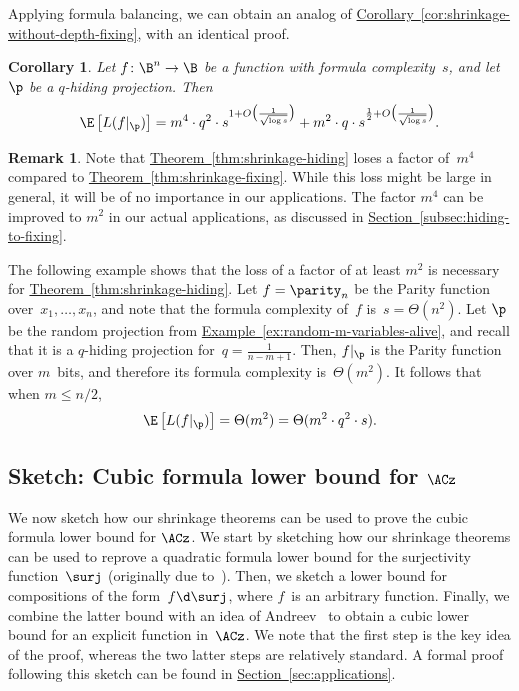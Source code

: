 \documentclass[11pt]{article}
\numberwithin{equation}{section}
\newtheorem{corollary}[theorem]{Corollary}
\theoremstyle{definition}
\newtheorem{remark}[theorem]{Remark}
\theoremstyle{plain}
\newcommand{\expref}[2]{\hyperref[#2]{#1~\ref{#2}}}
\theoremstyle{definition}\newtheorem{notation}[theorem]{Notation}\theoremstyle{plain}
\begin{document}
Applying formula balancing, we can obtain an analog of 
\expref{Corollary}{cor:shrinkage-without-depth-fixing},
with an identical proof. 
\begin{corollary}
\label{cor:shrinkage-without-depth-hiding} Let $f\colon\B^{n}\to\B$
be a function with formula complexity~$s$, and let $\p$ be a $q$-hiding
projection. Then 
\[
\E\left[L(f|_{\p})\right]=m^{4}\cdot q^{2}\cdot s^{1+O\bigl(\frac{1}{\sqrt{\log s}}\bigr)}+m^{2}\cdot q\cdot s^{\frac{1}{2}+O\bigl(\frac{1}{\sqrt{\log s}}\bigr)}.
\]
\end{corollary}

\begin{remark}
Note that \expref{Theorem}{thm:shrinkage-hiding} 
loses a factor of~$m^{4}$ compared
to \expref{Theorem}{thm:shrinkage-fixing}. While 
this loss might be large in general,
it will be of no importance in our applications. The factor $m^{4}$
can be improved to $m^{2}$ in our actual applications, as discussed
in %
\expref{Section}{subsec:hiding-to-fixing}.  %

The following example shows that the loss of a factor of at least
$m^{2}$ is necessary for \expref{Theorem}{thm:shrinkage-hiding}. 
Let $f=\parity_{n}$
be the Parity function over~$x_{1},\ldots,x_{n}$, and note that
the formula complexity of~$f$ is~$s=\Theta(n^{2})$. Let $\p$
be the random projection from \expref{Example}{ex:random-m-variables-alive}, and
recall that it is a $q$-hiding projection for~$q=\frac{1}{n-m+1}$.
Then, $f|_{\p}$ is the Parity function over $m$~bits, and therefore
its formula complexity is~$\Theta(m^{2})$. It follows that when
$m\leq n/2$, 
\[
\E\left[L(f|_{\p})\right]=\Theta(m^{2})=\Theta(m^{2}\cdot q^{2}\cdot s).
\]
\end{remark}


\subsection{\label{subsec:application-sketch}Sketch: Cubic formula lower bound
for \texorpdfstring{$\protect\ACz$}{AC0}}

We now sketch how our shrinkage theorems can be used to prove the
cubic formula lower bound for $\ACz$. We start by sketching how our
shrinkage theorems can be used to reprove a quadratic formula lower
bound for the surjectivity function~$\surj$ (originally due to~\cite{BM12}).
Then, we sketch a lower bound for compositions of the form~$f\d\surj$,
where $f$~is an arbitrary function. Finally, we combine the latter
bound with an idea of Andreev~\cite{A87} to obtain a cubic lower
bound for an explicit function in~$\ACz$. We note that the first
step is the key idea of the proof, whereas the two latter steps are
relatively standard. A formal proof following this sketch can be found
in \expref{Section}{sec:applications}.
\end{document}
